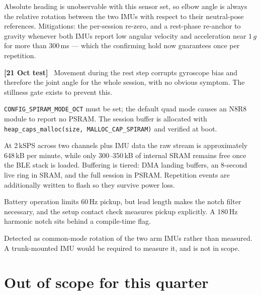 \documentclass[11pt]{article}
\newcommand{\tested}{{\sffamily\scriptsize\color{good}\textbf{[21 Oct test]}}\ }
\begin{document}
\begin{description}[leftmargin=0pt,style=unboxed,itemsep=5pt]
\item[\textcolor{marker}{Yaw drift without a magnetometer.}] Absolute heading is
unobservable with this sensor set, so elbow angle is always the relative
rotation between the two IMUs with respect to their neutral-pose references.
Mitigations: the per-session re-zero, and a rest-phase re-anchor to gravity
whenever both IMUs report low angular velocity and acceleration near $1\,g$ for
more than 300\,ms --- which the confirming hold now guarantees once per
repetition.

\item[\textcolor{marker}{Gyroscope bias corruption at calibration.}] \tested
Movement during the rest step corrupts gyroscope bias and therefore the joint
angle for the whole session, with no obvious symptom. The stillness gate exists
to prevent this.

\item[\textcolor{marker}{PSRAM configuration.}]
\texttt{CONFIG\_SPIRAM\_MODE\_OCT} must be set; the default quad mode causes an
N8R8 module to report no PSRAM. The session buffer is allocated with
\texttt{heap\_caps\_malloc(size, MALLOC\_CAP\_SPIRAM)} and verified at boot.

\item[\textcolor{marker}{Buffer sizing.}] At 2\,kSPS across two channels plus IMU
data the raw stream is approximately 648\,kB per minute, while only 300--350\,kB
of internal SRAM remains free once the BLE stack is loaded. Buffering is tiered:
DMA landing buffers, an 8-second live ring in SRAM, and the full session in
PSRAM. Repetition events are additionally written to flash so they survive power
loss.

\item[\textcolor{marker}{Mains interference.}] Battery operation limits 60\,Hz
pickup, but lead length makes the notch filter necessary, and the setup contact
check measures pickup explicitly. A 180\,Hz harmonic notch sits behind a
compile-time flag.

\item[\textcolor{marker}{Trunk lean is inferred.}] Detected as common-mode
rotation of the two arm IMUs rather than measured. A trunk-mounted IMU would be
required to measure it, and is not in scope.
\end{description}

\section{Out of scope for this quarter}
\end{document}
